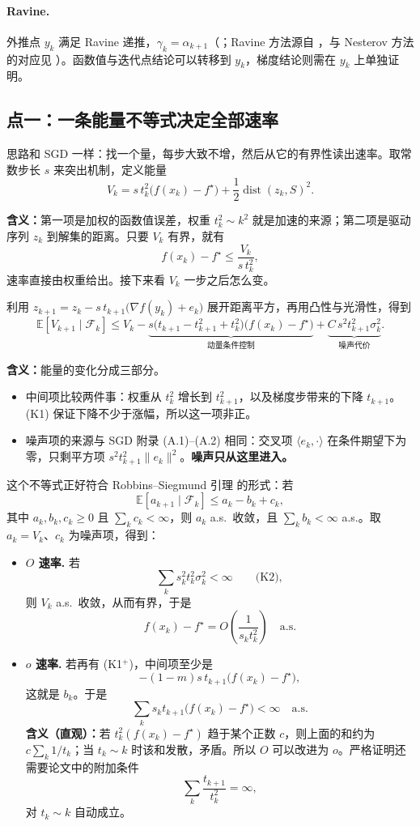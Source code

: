 \documentclass[11pt]{ctexart}
\newcommand{\E}{\mathbb{E}}
\newcommand{\F}{\mathcal{F}}
\newcommand{\dist}{\operatorname{dist}}
\begin{document}
\paragraph{Ravine.}
外推点 $y_k$ 满足 Ravine 递推，$\gamma_k=\alpha_{k+1}$（\citealp[Theorem~2.1]{attouch2026ravine}；Ravine 方法源自 \citealp{gelfand1961}，与 Nesterov 方法的对应见 \citealp{attouch2022ravine}）。函数值与迭代点结论可以转移到 $y_k$，梯度结论则需在 $y_k$ 上单独证明。

\subsection{点一：一条能量不等式决定全部速率}

思路和 SGD 一样：找一个量，每步大致不增，然后从它的有界性读出速率。取常数步长 $s$ 来突出机制，定义能量
\[
V_k=s\,t_k^2\bigl(f(x_k)-f^\star\bigr)+\frac12\dist(z_k,S)^2 .
\]

\textbf{含义：}第一项是加权的函数值误差，权重 $t_k^2\sim k^2$ 就是加速的来源；第二项是驱动序列 $z_k$ 到解集的距离。只要 $V_k$ 有界，就有
\[
f(x_k)-f^\star\le\frac{V_k}{s\,t_k^2},
\]
速率直接由权重给出。接下来看 $V_k$ 一步之后怎么变。

利用 $z_{k+1}=z_k-s\,t_{k+1}\bigl(\nabla f(y_k)+e_k\bigr)$ 展开距离平方，再用凸性与光滑性，得到
\[
\E[V_{k+1}\mid\F_k]
\le V_k
-\underbrace{s\bigl(t_{k+1}-t_{k+1}^2+t_k^2\bigr)\bigl(f(x_k)-f^\star\bigr)}_{\text{动量条件控制}}
+\underbrace{C\,s^2t_{k+1}^2\sigma_k^2}_{\text{噪声代价}} .
\]

\textbf{含义：}能量的变化分成三部分。
\begin{itemize}
  \item 中间项比较两件事：权重从 $t_k^2$ 增长到 $t_{k+1}^2$，以及梯度步带来的下降 $t_{k+1}$。(K1) 保证下降不少于涨幅，所以这一项非正。
  \item 噪声项的来源与 SGD 附录 (A.1)--(A.2) 相同：交叉项 $\langle e_k,\cdot\rangle$ 在条件期望下为零，只剩平方项 $s^2t_{k+1}^2\|e_k\|^2$。\textbf{噪声只从这里进入。}
\end{itemize}

这个不等式正好符合 Robbins--Siegmund 引理 \citep{robbins1971} 的形式：若
\[
\E[a_{k+1}\mid\F_k]\le a_k-b_k+c_k,
\]
其中 $a_k,b_k,c_k\ge0$ 且 $\sum_k c_k<\infty$，则 $a_k$ a.s.\ 收敛，且 $\sum_k b_k<\infty$ a.s.。取 $a_k=V_k$、$c_k$ 为噪声项，得到：

\begin{itemize}
  \item \textbf{$O$ 速率.} 若
  \[
  \sum_k s_k^2t_k^2\sigma_k^2<\infty \qquad \text{(K2)},
  \]
  则 $V_k$ a.s.\ 收敛，从而有界，于是
  \[
  f(x_k)-f^\star=O\!\left(\frac{1}{s_kt_k^2}\right)\quad\text{a.s.}
  \]
  \item \textbf{$o$ 速率.} 若再有 (K1$^+$)，中间项至少是
  \[
  -(1-m)s\,t_{k+1}\bigl(f(x_k)-f^\star\bigr),
  \]
  这就是 $b_k$。于是
  \[
  \sum_k s_kt_{k+1}\bigl(f(x_k)-f^\star\bigr)<\infty\quad\text{a.s.}
  \]
  \textbf{含义（直观）：}若 $t_k^2(f(x_k)-f^\star)$ 趋于某个正数 $c$，则上面的和约为 $c\sum_k1/t_k$；当 $t_k\sim k$ 时该和发散，矛盾。所以 $O$ 可以改进为 $o$。严格证明还需要论文中的附加条件
  \[
  \sum_k\frac{t_{k+1}}{t_k^2}=\infty ,
  \]
  对 $t_k\sim k$ 自动成立。
\end{itemize}
\end{document}
